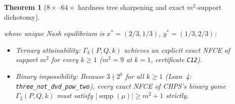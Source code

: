 \documentclass[11pt,a4paper]{article}
\newtheorem{theorem}{Theorem}
\theoremstyle{remark}
\newcommand{\supp}{\operatorname{supp}}
\begin{document}
\begin{theorem}[$8\times$--$64\times$ hardness tree sharpening and exact $m^2$-support dichotomy]
\begin{enumerate}
\begin{equation}
  \end{equation}
  whose unique Nash equilibrium is $x^* = (2/3, 1/3)$, $y^* = (1/3, 2/3)$:
  \begin{itemize}
    \item \emph{Ternary attainability:} $\Gamma_3(P,Q,k)$ achieves an explicit exact NFCE of support $m^2$ for every $k \ge 1$ ($m^2 = 9$ at $k=1$, certificate \texttt{C12}).
    \item \emph{Binary impossibility:} Because $3 \nmid 2^k$ for all $k \ge 1$ (Lean~4: \nolinkurl{three_not_dvd_pow_two}), \emph{every} exact NFCE of CHPS's binary game $\Gamma_2(P,Q,k)$ must satisfy $|\supp(\mu)| \ge m^2 + 1$ strictly.
  \end{itemize}
\end{enumerate}
\end{theorem}
\end{document}
